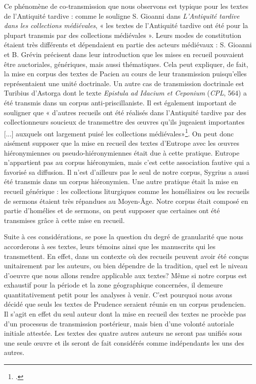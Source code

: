 \documentclass[a4paper,twoside,12pt]{book}
\begin{document}
Ce phénomène de co-transmission que nous observons est typique pour les textes de l'Antiquité tardive : comme le souligne S. Gioanni dans \textit{L'Antiquité tardive dans les collections médiévales}, « les textes de l'Antiquité tardive ont été pour la plupart transmis par des collections médiévales ». Leurs modes de constitution étaient très différents et dépendaient en partie des acteurs médiévaux : S. Gioanni et B. Grévin précisent dans leur introduction que les mises en recueil pouvaient être auctoriales, génériques, mais aussi thématiques. Cela peut expliquer, de fait, la mise en corpus des textes de Pacien au cours de leur transmission puisqu'elles représentaient une unité doctrinale. Un autre cas de transmission doctrinale est Turibius d'Astorga dont le texte \textit{Epistula ad Idacium et Ceponium} (\textit{CPL}, 564) a été transmis dans un corpus anti-priscillaniste. Il est également important de souligner que « d'autres recueils ont été réalisés dans l'Antiquité tardive par des collectionneurs soucieux de transmettre des œuvres qu'ils jugeaient importantes [...] auxquels ont largement puisé les collections médiévales»\footcite[p.5]{collectionAT}. On peut donc aisément supposer que la mise en recueil des textes d'Eutrope avec les œuvres hiéronymiennes ou pseudo-hiéronymiennes était due à cette pratique. Eutrope n’appartient pas au corpus hiéronymien, mais c’est cette association fautive qui a favorisé sa diffusion. Il n'est d'ailleurs pas le seul de notre corpus, Sygrius a aussi été transmis dans un corpus hiéronymien. Une autre pratique était la mise en recueil générique : les collections liturgiques comme les homéliaires ou les recueils de sermons étaient très répandues au Moyen-Âge. Notre corpus était composé en partie d'homélies et de sermons, on peut supposer que certaines ont été transmises grâce à cette mise en recueil. 


Suite à ces considérations, se pose la question du degré de granularité que nous accorderons à ses textes, leurs témoins  ainsi que les manuscrits qui les transmettent. En effet, dans un contexte où des recueils peuvent avoir été conçus unitairement par les auteurs, ou bien dépendre de la tradition, quel est le niveau d'oeuvre que nous allons rendre applicable aux textes? Même si notre corpus est exhaustif pour la période et la zone géographique concernées, il demeure quantitativement petit pour les analyses à venir.  C'est pourquoi nous avons décidé que seuls les textes de Prudence seraient réunis en un  corpus prudencien. Il s’agit en effet du seul auteur dont la mise en recueil des textes ne procède pas d’un processus de transmission postérieur, mais bien d’une volonté autoriale initiale attestée. Les textes des quatre autres auteurs ne seront pas unifiés sous une seule œuvre  et ils seront de fait considérés comme indépendants les uns des autres.
\end{document}
